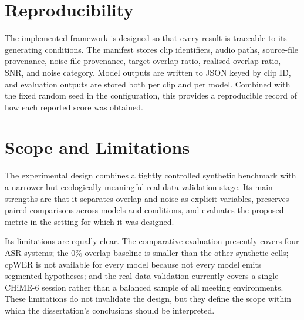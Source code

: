 \section{Reproducibility}
The implemented framework is designed so that every result is traceable to its generating conditions. The manifest stores clip identifiers, audio paths, source-file provenance, noise-file provenance, target overlap ratio, realised overlap ratio, SNR, and noise category. Model outputs are written to JSON keyed by clip ID, and evaluation outputs are stored both per clip and per model. Combined with the fixed random seed in the configuration, this provides a reproducible record of how each reported score was obtained.

\section{Scope and Limitations}
The experimental design combines a tightly controlled synthetic benchmark with a narrower but ecologically meaningful real-data validation stage. Its main strengths are that it separates overlap and noise as explicit variables, preserves paired comparisons across models and conditions, and evaluates the proposed metric in the setting for which it was designed.

Its limitations are equally clear. The comparative evaluation presently covers four ASR systems; the \(0\%\) overlap baseline is smaller than the other synthetic cells; cpWER is not available for every model because not every model emits segmented hypotheses; and the real-data validation currently covers a single CHiME-6 session rather than a balanced sample of all meeting environments. These limitations do not invalidate the design, but they define the scope within which the dissertation's conclusions should be interpreted.